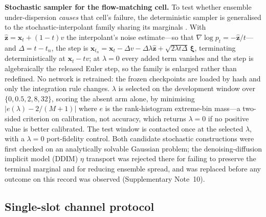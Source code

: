 \textbf{Stochastic sampler for the flow-matching cell.} To test whether ensemble
under-dispersion \emph{causes} that cell's failure, the deterministic sampler is generalised to
the stochastic-interpolant family sharing its marginals
\cite{albergo2023stochastic,ma2024sit}. With $\hat{\boldsymbol z}=\boldsymbol x_t+(1-t)v$ the
interpolant's noise estimate---so that $\nabla\log p_t=-\hat{\boldsymbol z}/t$---and
$\Delta=t-t_n$, the step is
$\boldsymbol x_{t_n}=\boldsymbol x_t-\Delta v-\Delta\lambda\hat{\boldsymbol z}
+\sqrt{2\lambda t\Delta}\,\boldsymbol\xi$, terminating deterministically at
$\boldsymbol x_t-tv$; at $\lambda=0$ every added term vanishes and the step is algebraically the
released Euler step, so the family is enlarged rather than redefined. No network is retrained:
the frozen checkpoints are loaded by hash and only the integration rule changes. $\lambda$ is
selected on the development window over $\{0,0.5,2,8,32\}$, scoring the absent arm alone, by
minimising $|e(\lambda)-2/(M{+}1)|$ where $e$ is the rank-histogram extreme-bin mass---a
two-sided criterion on calibration, not accuracy, which returns $\lambda=0$ if no positive value
is better calibrated. The test window is contacted once at the selected $\lambda$, with a
$\lambda=0$ port-fidelity control. Both candidate stochastic constructions were first checked on
an analytically solvable Gaussian problem; the denoising-diffusion implicit model (DDIM)
$\eta$ transport was rejected there for
failing to preserve the terminal marginal and for reducing ensemble spread, and was replaced
before any outcome on this record was observed (Supplementary Note~10).

\subsection{Single-slot channel protocol}\label{sec:slotmethods}

